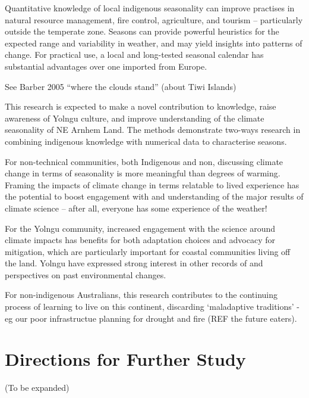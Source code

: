 Quantitative knowledge of local indigenous seasonality can improve practises in
natural resource management, fire control, agriculture, and tourism –
particularly outside the temperate zone.  Seasons can provide powerful
heuristics for the expected range and variability in weather, and may yield
insights into patterns of change.  For practical use, a local and long-tested
seasonal calendar has substantial advantages over one imported from Europe.


See Barber 2005 ``where the clouds stand'' (about Tiwi Islands)

This research is expected to make a novel contribution to knowledge, raise
awareness of Yolngu culture, and improve understanding of the climate
seasonality of NE Arnhem Land.  The methods demonstrate two-ways research in
combining indigenous knowledge with numerical data to characterise seasons.

For non-technical communities, both Indigenous and non, discussing climate
change in terms of seasonality is more meaningful than degrees of warming.
Framing the impacts of climate change in terms relatable to lived experience
has the potential to boost engagement with and understanding of the major
results of climate science – after all, everyone has some experience of the
weather!

For the Yolngu community, increased engagement with the science around climate
impacts has benefits for both adaptation choices and advocacy for mitigation,
which are particularly important for coastal communities living off the land.
Yolngu have expressed strong interest in other records of and perspectives on
past environmental changes.

For non-indigenous Australians, this research contributes to the continuing
process of learning to live on this continent, discarding `maladaptive traditions'
- eg our poor infrastructue planning for drought and fire (REF the future eaters).



\section{Directions for Further Study}
\label{sec:further-study}
(To be expanded)

